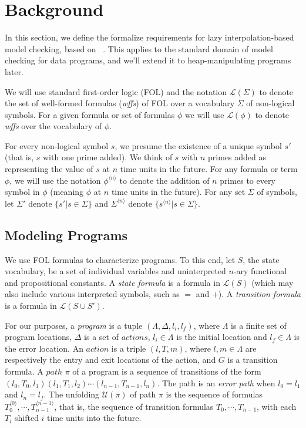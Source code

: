\section{Background}
\label{sec:background}

In this section, we define the formalize requirements for lazy interpolation-based model checking, based on ~\cite{mcmillan06}. This applies to the standard domain of model checking for data programs, and we'll extend it to heap-manipulating programs later.

We will use standard first-order logic (FOL) and the notation $\mathcal{L}(\Sigma)$ to denote the set of well-formed formulas (\textit{wffs}) of FOL over a vocabulary $\Sigma$ of non-logical symbols. For a given formula or set of formulas $\phi$ we will use $\mathcal{L}(\phi)$ to denote \textit{wffs} over the vocabulary of $\phi$.

For every non-logical symbol $s$, we presume the existence of a unique symbol $s'$ (that is, $s$ with one prime added). We think of $s$ with $n$ primes added as representing the value of $s$ at $n$ time units in the future. For any formula or term $\phi$, we will use the notation $\phi^{\langle n \rangle}$ to denote the addition of $n$ primes to every symbol in $\phi$ (meaning $\phi$ at $n$ time units in the future). For any set $\Sigma$ of symbols, let $\Sigma'$ denote $\{ s' | s \in \Sigma \}$ and $\Sigma^{\langle n \rangle}$ denote $\{ s^{\langle n \rangle} | s \in \Sigma \}$.

\subsection{Modeling Programs}

We use FOL formulas to characterize programs. To this end, let $S$, the state vocabulary, be a set of individual variables and uninterpreted $n$-ary functional and propositional constants. A \textit{state formula} is a formula in $\mathcal{L}(S)$ (which may also include various interpreted symbols, such as $=$ and $+$). A \textit{transition formula} is a formula in $\mathcal{L}(S \cup S')$.

For our purposes, a \textit{program} is a tuple $(\Lambda, \Delta, l_i, l_f)$, where $\Lambda$ is a finite set of program locations, $\Delta$ is a set of $actions$, $l_i \in \Lambda$ is the initial location and $l_f \in \Lambda$ is the error location. An $action$ is a triple $(l, T, m)$, where $l,m \in \Lambda$ are respectively the entry and exit locations of the action, and $G$ is a transition formula. A $path$ $\pi$ of a program is a sequence of transitions of the form $(l_0, T_0, l_1)(l_1, T_1, l_2) \cdots (l_{n-1}, T_{n-1}, l_n)$. The path is an \textit{error path} when $l_0 = l_1$ and $l_n = l_f$. The unfolding $\mathcal{U}(\pi)$ of path $\pi$ is the sequence of formulas $T_0^{\langle 0 \rangle}, \cdots, T_{n-1}^{\langle n-1 \rangle}$, that is, the sequence of transition formulas $T_0, \cdots, T_{n-1}$, with each $T_i$ shifted $i$ time units into the future.

